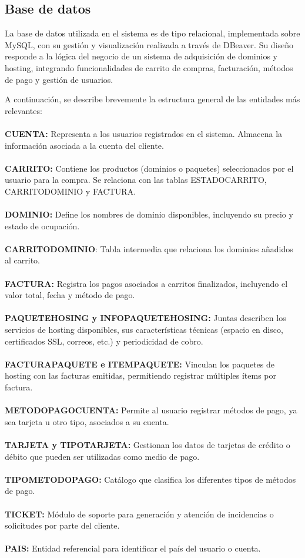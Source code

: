 \subsection{Base de datos}
La base de datos utilizada en el sistema es de tipo relacional, implementada sobre MySQL, con su gestión y visualización realizada a través de DBeaver. Su diseño responde a la lógica del negocio de un sistema de adquisición de dominios y hosting, integrando funcionalidades de carrito de compras, facturación, métodos de pago y gestión de usuarios.

A continuación, se describe brevemente la estructura general de las entidades más relevantes:\\\\
\textbf{CUENTA:} Representa a los usuarios registrados en el sistema. Almacena la información asociada a la cuenta del cliente.\\\\
\textbf{CARRITO:} Contiene los productos (dominios o paquetes) seleccionados por el usuario para la compra. Se relaciona con las tablas ESTADOCARRITO, CARRITODOMINIO y FACTURA.\\\\
\textbf{DOMINIO:} Define los nombres de dominio disponibles, incluyendo su precio y estado de ocupación.\\\\
\textbf{CARRITODOMINIO}: Tabla intermedia que relaciona los dominios añadidos al carrito.\\\\
\textbf{FACTURA:} Registra los pagos asociados a carritos finalizados, incluyendo el valor total, fecha y método de pago.\\\\
\textbf{PAQUETEHOSING y INFOPAQUETEHOSING:} Juntas describen los servicios de hosting disponibles, sus características técnicas (espacio en disco, certificados SSL, correos, etc.) y periodicidad de cobro.\\\\
\textbf{FACTURAPAQUETE e ITEMPAQUETE:} Vinculan los paquetes de hosting con las facturas emitidas, permitiendo registrar múltiples ítems por factura.\\\\
\textbf{METODOPAGOCUENTA:} Permite al usuario registrar métodos de pago, ya sea tarjeta u otro tipo, asociados a su cuenta.\\\\
\textbf{TARJETA y TIPOTARJETA:} Gestionan los datos de tarjetas de crédito o débito que pueden ser utilizadas como medio de pago.\\\\
\textbf{TIPOMETODOPAGO:} Catálogo que clasifica los diferentes tipos de métodos de pago.\\\\
\textbf{TICKET:} Módulo de soporte para generación y atención de incidencias o solicitudes por parte del cliente.\\\\
\textbf{PAIS:} Entidad referencial para identificar el país del usuario o cuenta.
